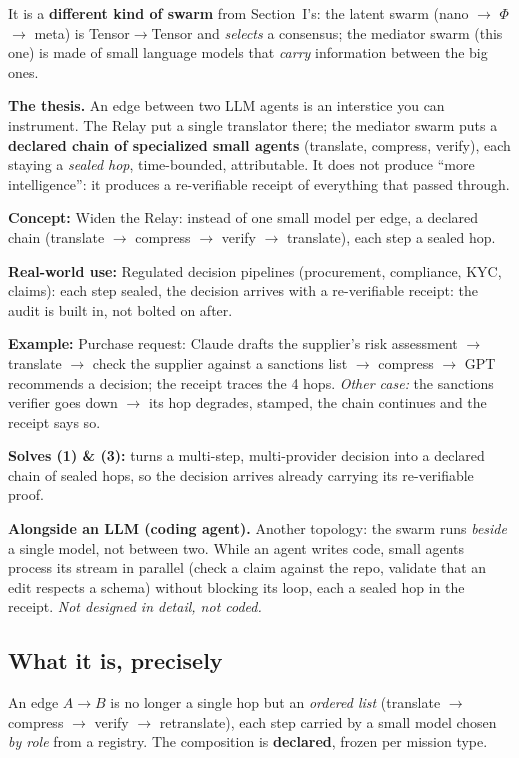 \documentclass[11pt]{article}
\newcommand{\concept}[1]{{\color{efenavy}\textbf{Concept:} }#1\par}
\newcommand{\exemple}[1]{{\color{efeamber}\textbf{Example:} }#1\par}
\newcommand{\utilite}[1]{{\color{efeplum}\textbf{Real-world use:} }#1\par}
\newcommand{\solves}[2]{{\color{efesolve}\textbf{Solves #1:} }#2\par}
\begin{document}
It is a \textbf{different kind of swarm} from Section~I's: the latent swarm (nano $\rightarrow$
$\Phi$ $\rightarrow$ meta) is Tensor$\rightarrow$Tensor and \emph{selects} a consensus; the mediator swarm (this one) is made of small language models that \emph{carry} information between the big
ones.

\textbf{The thesis.} An edge between two LLM agents is an interstice you can instrument. The Relay
put a single translator there; the mediator swarm puts a \textbf{declared chain of specialized small agents} (translate, compress, verify), each staying a \emph{sealed hop}, time-bounded, attributable.
It does not produce ``more intelligence'': it produces a re-verifiable receipt of everything that
passed through.

\concept{Widen the Relay: instead of one small model per edge, a declared chain (translate
$\rightarrow$ compress $\rightarrow$ verify $\rightarrow$ translate), each step a sealed hop.}
\utilite{Regulated decision pipelines (procurement, compliance, KYC, claims): each step sealed, the
decision arrives with a re-verifiable receipt: the audit is built in, not bolted on after.}
\exemple{Purchase request: Claude drafts the supplier's risk assessment $\rightarrow$ translate
$\rightarrow$ check the supplier against a sanctions list $\rightarrow$ compress $\rightarrow$ GPT
recommends a decision; the receipt traces the 4 hops. \emph{Other case:} the sanctions verifier goes
down $\rightarrow$ its hop degrades, stamped, the chain continues and the receipt says so.}
\solves{(1) \& (3)}{turns a multi-step, multi-provider decision into a declared chain of sealed hops, so the decision arrives already carrying its re-verifiable proof.}

\textbf{Alongside an LLM (coding agent).} Another topology: the swarm runs \emph{beside} a single
model, not between two. While an agent writes code, small agents process its stream in parallel
(check a claim against the repo, validate that an edit respects a schema) without blocking its loop,
each a sealed hop in the receipt. \emph{Not designed in detail, not coded.}

\subsection{What it is, precisely}
An edge $A\rightarrow B$ is no longer a single hop but an \emph{ordered list} (translate $\rightarrow$
compress $\rightarrow$ verify $\rightarrow$ retranslate), each step carried by a small model chosen
\emph{by role} from a registry. The composition is \textbf{declared}, frozen per mission type.
\end{document}
